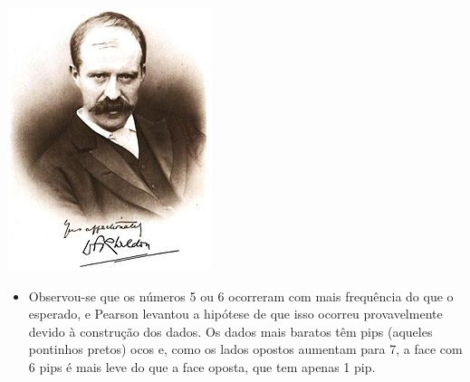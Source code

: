 \begin{frame}
{\begin{itemize}
\end{itemize}
}
{
\begin{center}
\includegraphics[width=\textwidth]{6-3_chisq_gof/weldon.jpeg}
\end{center}
}
\begin{itemize}
\justifying
\small
\item Observou-se que os números 5 ou 6 ocorreram com mais frequência do que o esperado, e Pearson levantou a hipótese de que isso ocorreu provavelmente devido à construção dos dados. Os dados mais baratos têm pips (aqueles pontinhos pretos) ocos e, como os lados opostos aumentam para 7, a face com 6 pips é mais leve do que a face oposta, que tem apenas 1 pip.

\end{itemize}

\end{frame}



